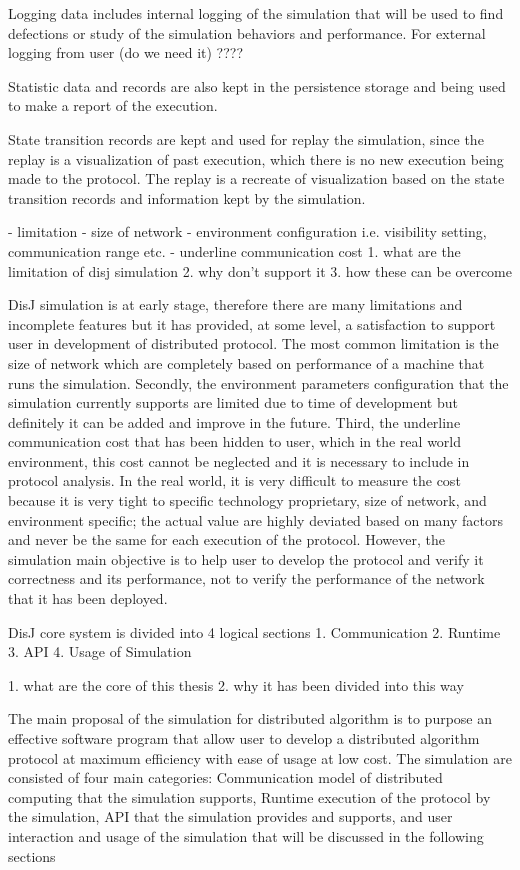 Logging data includes internal logging of the simulation that will be used to find defections or study of the simulation behaviors and performance. For external logging from user (do we need it) ????

Statistic data and records are also kept in the persistence storage and being used to make a report of the execution.

State transition records are kept and used for replay the simulation, since the replay is a visualization of past execution, which there is no new execution being made to the protocol. The replay is a recreate of visualization based on the state transition records and information kept by the simulation.


- limitation
	- size of network
	- environment configuration i.e. visibility setting, communication range etc.
	- underline communication cost
1. what are the limitation of disj simulation
2. why don't support it
3. how these can be overcome

DisJ simulation is at early stage, therefore there are many limitations and incomplete features but it has provided, at some level, a satisfaction to support user in development of distributed protocol. The most common limitation is the size of network which are completely based on performance of a machine that runs the simulation. Secondly, the environment parameters configuration that the simulation currently supports are limited due to time of development but definitely it can be added and improve in the future. Third, the underline communication cost that has been hidden to user, which in the real world environment, this cost cannot be neglected and it is necessary to include in protocol analysis. In the real world, it is very difficult to measure the cost because it is very tight to specific technology proprietary, size of network, and environment specific; the actual value are highly deviated based on many factors and never be the same for each execution of the protocol. However, the simulation main objective is to help user to develop the protocol and verify it correctness and its performance, not to verify the performance of the network that it has been deployed.


DisJ core system is divided into 4 logical sections
1. Communication
2. Runtime
3. API
4. Usage of Simulation

1. what are the core of this thesis
2. why it has been divided into this way

The main proposal of the simulation for distributed algorithm is to purpose an effective software program that allow user to develop a distributed algorithm protocol at maximum efficiency with ease of usage at low cost. The simulation are consisted of four main categories: Communication model of distributed computing that the simulation supports, Runtime execution of the protocol by the simulation, API that the simulation provides and supports, and user interaction and usage of the simulation that will be discussed in the following sections


